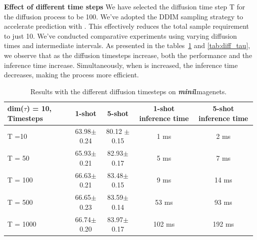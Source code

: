 \textbf{Effect of different time steps}
We have selected the diffusion time step T for the diffusion process to be 100. We've adopted the DDIM sampling strategy to accelerate prediction with 
. This effectively reduces the total sample requirement to just 10. We've conducted comparative experiments using varying diffusion times and intermediate intervals. As presented in the tables~\ref{tab:diff_time} and \ref{tab:diff_tau}, we observe that as the diffusion timesteps increase, both the performance and the inference time increase. Simultaneously, when is increased, the inference time decreases, making the process more efficient.


\begin{table}[ht]
\small
\caption{Results with the different diffusion timesteps on \textbf{\textit{mini}}Imagenets.}
\centering
\begin{tabular}{lcccc}
\toprule 
dim($\tau$) = 10, \textbf{Timesteps} & \textbf{1-shot} & \textbf{5-shot}  & \textbf{1-shot inference time}  & \textbf{5-shot inference time}   \\
\midrule 
T =10  & 63.98\textcolor{mygray}{\scriptsize{$\pm$0.24}} & 80.12 \textcolor{mygray}{\scriptsize{$\pm$0.15}} &1 ms &  2 ms\\
T = 50 & 65.93\textcolor{mygray}{\scriptsize{$\pm$0.21}} & 82.93\textcolor{mygray}{\scriptsize{$\pm$0.17}}  &5 ms &  7 ms\\
T = 100 & 66.63\textcolor{mygray}{\scriptsize{$\pm$0.21}} & 83.48\textcolor{mygray}{\scriptsize{$\pm$0.15}}   &9 ms &  14 ms\\
T = 500 & 66.65\textcolor{mygray}{\scriptsize{$\pm$0.23}} & 83.59\textcolor{mygray}{\scriptsize{$\pm$0.14}}  &53 ms &  93 ms\\
T = 1000 & 66.74\textcolor{mygray}{\scriptsize{$\pm$0.20}} & 83.97\textcolor{mygray}{\scriptsize{$\pm$0.17}}   &102 ms &  192 ms\\
\bottomrule
\end{tabular}
\label{tab:diff_time}
\end{table}


